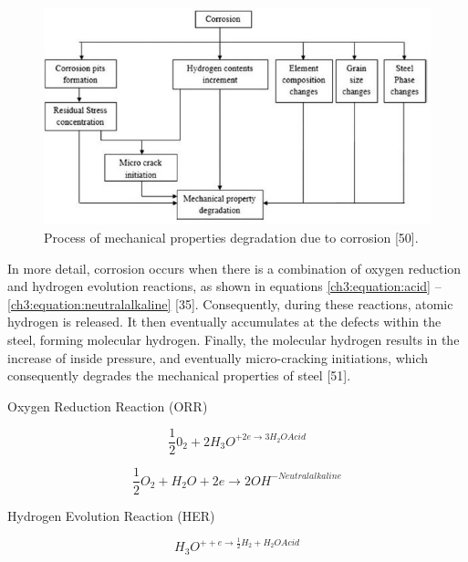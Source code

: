 \documentclass[12pt]{report}
\begin{document}
\begin{figure}[H]
    \centering
    \includegraphics[width=\textwidth]{process_of_mechanical_properties.jpg}
    \caption{Process of mechanical properties degradation due to corrosion [50].}
    \label{ch3:figure:degradation}
\end{figure}

In more detail, corrosion occurs when there is a combination of oxygen reduction and hydrogen evolution reactions, as shown in equations \ref{ch3:equation:acid} – \ref{ch3:equation:neutralalkaline} [35].  Consequently, during these reactions, atomic hydrogen is released. It then eventually accumulates at the defects within the steel, forming molecular hydrogen. Finally, the molecular hydrogen results in the increase of inside pressure, and eventually micro-cracking initiations, which consequently degrades the mechanical properties of steel [51].

\begin{center}
    Oxygen Reduction Reaction (ORR)
\end{center}

\begin{equation}
    \frac{1}{2}0_2 + 2H_3O^{+2e \rightarrow 3H_2OAcid}
    \label{ch3:equation:acid}
\end{equation}

\begin{equation}
    \frac{1}{2}O_2 + H_2O + 2e \rightarrow 2OH^{-Neutralalkaline}
\end{equation}

\begin{center}
    Hydrogen Evolution Reaction (HER)
\end{center}

\begin{equation}
    H_3O^{++e \rightarrow \frac{1}{2}H_2 + H_2OAcid}
\end{equation}
\end{document}
